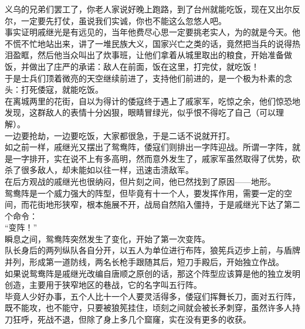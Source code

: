 \begin{multicols}{\theparacolNo}
义乌的兄弟们罢工了，你老人家说好晚上跑路，到了台州就能吃饭，现在又出尔反尔，一定要先打仗，虽说我们实诚，你也不能这么忽悠人吧。\\

事实证明戚继光是有远见的，当年他费尽心思一定要挑老实人，为的就是今天。他不慌不忙地站出来，讲了一堆民族大义，国家兴亡之类的话，竟然把当兵的说得热泪盈眶，然后他当众叫出了炊事班，让他们拿着从城里取出的粮食，开始准备做饭，并做出了庄严的承诺：敌人在前面，饭在这里，打完仗，就吃饭！\\

于是士兵们顶着微亮的天空继续前进了，支持他们前进的，是一个极为朴素的念头：打死倭寇，就能吃饭。\\

在离城两里的花街，自以为得计的倭寇终于遇上了戚家军，吃惊之余，他们惊恐地发现，这群敌人的表情十分凶狠，眼睛冒绿光，似乎恨不得吃了自己（可以理解）。\\

一边要抢劫，一边要吃饭，大家都很急，于是二话不说就开打。\\

如之前一样，戚继光又摆出了鸳鸯阵，倭寇们则排出一字阵迎战。所谓一字阵，就是一字排开，实在说不上有多高明，然而意外发生了，戚家军虽然取得了优势，砍杀了很多敌人，却未能如以往一样，迅速击溃敌军。\\

在后方观战的戚继光也很纳闷，但片刻之间，他已然找到了原因——地形。\\

鸳鸯阵是一个威力强大的阵型，但毕竟有十一个人，要发挥作用，需要一定的空间，而花街地形狭窄，根本施展不开，战局自然陷入僵持，于是戚继光下达了第二个命令：\\

“变阵！”\\

瞬息之间，鸳鸯阵突然发生了变化，开始了第一次变阵。\\

队长身后的两列纵队各自分开，以五人为单位进行布阵，狼筅兵迈步上前，与盾牌并列，形成第一道防线，两名长枪手跟随其后，短刀手殿后，开始独立作战。\\

如果说鸳鸯阵是戚继光改编自唐顺之原创的话，那这个阵型应该算是他的独立发明创造，主要用于狭窄地区的巷战，它的名字叫五行阵。\\

毕竟人少好办事，五个人比十一个人要灵活得多，倭寇们挥舞长刀，面对五行阵，既不能攻，也不能守，只要被狼筅挂住，顷刻之间就会被长矛刺穿，虽然许多人持刀狂呼，死战不退，但除了身上多几个窟窿，实在没有更多的收获。\\


\end{multicols}
